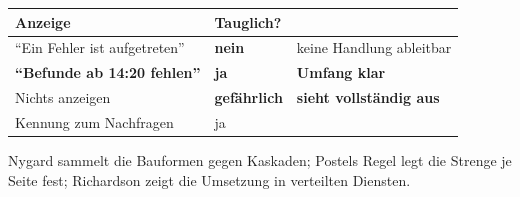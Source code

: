 \begin{aufgabe}
\begin{warnung}
\begin{center}
\renewcommand{\arraystretch}{1.5}
\begin{tabular}{@{}P{3.0cm}P{2.2cm}P{2.8cm}@{}}
\toprule
\textbf{Anzeige} & \textbf{Tauglich?} & \\
\midrule
\enquote{Ein Fehler ist aufgetreten} & \textcolor{akzent}{\textbf{nein}} & \textcolor{akzent}{keine Handlung ableitbar}\\
\textbf{\enquote{Befunde ab 14:20 fehlen}} & \textcolor{gruen}{\textbf{ja}} & \textcolor{gruen}{\textbf{Umfang klar}}\\
Nichts anzeigen & \textcolor{akzent}{\textbf{gefährlich}} & \textcolor{akzent}{\textbf{sieht vollständig aus}}\\
Kennung zum Nachfragen & \textcolor{gruen}{ja} & \\
\bottomrule
\end{tabular}
\end{center}

\begin{center}
\begin{minipage}{0.88\textwidth}
\end{minipage}
\end{center}

\begin{center}
\end{center}
\end{warnung}
\end{aufgabe}
\vspace{-4pt}
\noindent Nygard sammelt die Bau\-for\-men gegen Kas\-ka\-den; Postels Regel legt die Streng\-e je Seite fest; Richardson zeigt die Um\-set\-zung in ver\-teil\-ten Diens\-ten.
